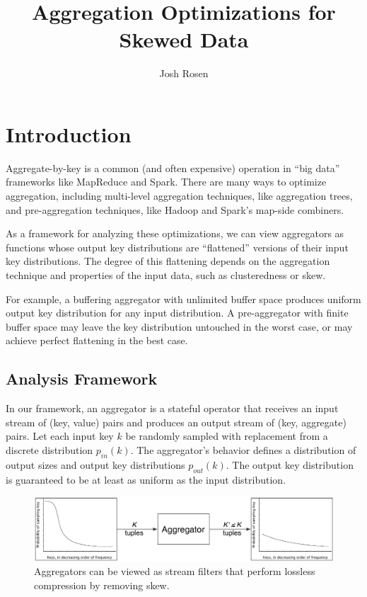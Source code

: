 \documentclass[12pt]{article}
\title{Aggregation Optimizations for Skewed Data}
\author{Josh Rosen}
\begin{document}
\maketitle

\section{Introduction}

Aggregate-by-key is a common (and often expensive) operation in ``big data''
frameworks like MapReduce and Spark.
%
There are many ways to optimize aggregation, including multi-level
aggregation techniques, like aggregation trees, and pre-aggregation
techniques, like Hadoop and Spark's map-side combiners.

As a framework for analyzing these optimizations, we can view aggregators as
functions whose output key distributions are ``flattened'' versions of their
input key distributions.  The degree of this flattening depends on the aggregation
technique and properties of the input data, such as clusteredness or skew.

For example, a buffering aggregator with unlimited buffer space produces
uniform output key distribution for any input distribution.  A pre-aggregator
with finite buffer space may leave the key distribution untouched in the worst
case, or may achieve perfect flattening in the best case.

\subsection{Analysis Framework}

In our framework, an aggregator is a stateful operator that receives an input
stream of (key, value) pairs and produces an output stream of (key, aggregate)
pairs.  Let each input key $k$ be randomly sampled with replacement
from a discrete distribution $p_{in}(k)$.  The aggregator's behavior defines
a distribution of output sizes and output key distributions $p_{out}(k)$.
The output key distribution is guaranteed to be at least as uniform as the
input distribution.

\begin{figure}
\begin{center}
    \includegraphics[width=\textwidth]{figures/aggregator_as_filter}
\end{center}
\caption{Aggregators can be viewed as stream filters that perform lossless
compression by removing skew.}
\label{fig:aggregator_as_filter}
\end{figure}
\end{document}

